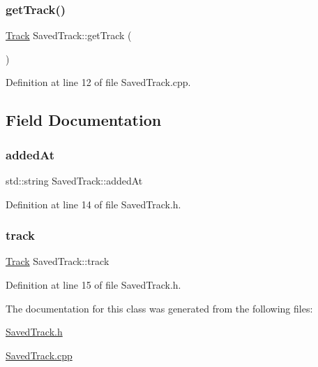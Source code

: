 \mbox{\label{class_saved_track_a604669cef47c5bf733995b4cab36b19c}} 
\subsubsection{\texorpdfstring{get\+Track()}{getTrack()}}
{\footnotesize\ttfamily \mbox{\hyperlink{class_track}{Track}} Saved\+Track\+::get\+Track (\begin{DoxyParamCaption}{ }\end{DoxyParamCaption})}



Definition at line 12 of file Saved\+Track.\+cpp.



\subsection{Field Documentation}
\mbox{\label{class_saved_track_a2f273169cdc5c067483e7de31e1a9767}} 
\subsubsection{\texorpdfstring{added\+At}{addedAt}}
{\footnotesize\ttfamily std\+::string Saved\+Track\+::added\+At\hspace{0.3cm}{\ttfamily [private]}}



Definition at line 14 of file Saved\+Track.\+h.

\mbox{\label{class_saved_track_a6a3eb68432e4a47b05e68bc748594577}} 
\subsubsection{\texorpdfstring{track}{track}}
{\footnotesize\ttfamily \mbox{\hyperlink{class_track}{Track}} Saved\+Track\+::track\hspace{0.3cm}{\ttfamily [private]}}



Definition at line 15 of file Saved\+Track.\+h.



The documentation for this class was generated from the following files\+:\begin{DoxyCompactItemize}
\item 
\mbox{\hyperlink{_saved_track_8h}{Saved\+Track.\+h}}\item 
\mbox{\hyperlink{_saved_track_8cpp}{Saved\+Track.\+cpp}}\end{DoxyCompactItemize}
